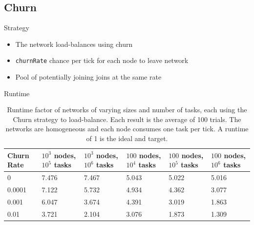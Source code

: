 \documentclass[11pt]{beamer}
\begin{document}
\subsection{Churn}
\begin{frame}{Strategy}
	\begin{itemize}
		
		\item The network load-balances using churn
		\item \texttt{churnRate} chance per tick for each node to leave network
		\item Pool of potentially joining joins at the same rate
	\end{itemize}
\end{frame}



\begin{frame}{Runtime}
	\begin{table}[h]
		\tiny
		\centering
		\caption[Churn Runtimes in a homogenious network]{Runtime factor of networks of varying sizes and number of tasks, each using the Churn strategy to load-balance.  Each result is the average of 100 trials. The networks are homogeneous and each node consumes one task per tick.  A runtime of 1 is the ideal and target.}
		\begin{tabular}{|p{1cm} || p{1cm} | p{1cm} | p{1cm} | p{1cm} | p{1cm} |}
			\hline
			Churn Rate & $ 10^{3}$ nodes, $ 10^{5}$ tasks & $ 10^{3}$ nodes, $ 10^{6}$ tasks & $ 100$ nodes, $ 10^{4}$ tasks & $ 100$ nodes, $ 10^{5}$ tasks &$ 100$ nodes, $ 10^{6}$ tasks \\ \hline
			0      & 7.476   &  7.467 &  5.043& 5.022 &5.016 \\\hline
			0.0001 & 7.122   &  5.732 &  4.934& 4.362&3.077 \\\hline
			0.001  & 6.047   &  3.674 &  4.391& 3.019  &1.863\\\hline
			0.01  &  3.721   &  2.104 &  3.076& 1.873 &1.309\\\hline
			
		\end{tabular}
		\label{tab:ChurnRuntimesHomogenious}
	\end{table}
\end{frame}

\end{document}
